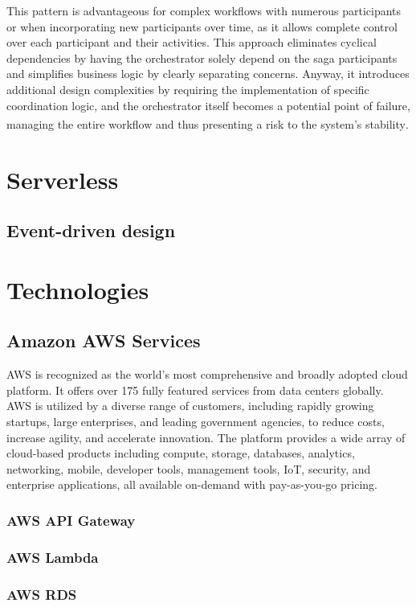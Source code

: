This pattern is advantageous for complex workflows with numerous participants or when incorporating
new participants over time, as it allows complete control over each participant and their
activities. This approach eliminates cyclical dependencies by having the orchestrator solely depend
on the saga participants and simplifies business logic by clearly separating concerns. Anyway, it
introduces additional design complexities by requiring the implementation of specific coordination
logic, and the orchestrator itself becomes a potential point of failure, managing the entire
workflow and thus presenting a risk to the system's stability\textsuperscript{\cite{ms_sagas}}.

\section{Serverless}
\subsection{Event-driven design}

\section{Technologies}
\subsection{Amazon AWS Services}
AWS is recognized as the world's most comprehensive and broadly adopted cloud platform. It offers
over 175 fully featured services from data centers globally. AWS is utilized by a diverse range of
customers, including rapidly growing startups, large enterprises, and leading government agencies,
to reduce costs, increase agility, and accelerate innovation. The platform provides a wide array of
cloud-based products including compute, storage, databases, analytics, networking, mobile, developer
tools, management tools, IoT, security, and enterprise applications, all available on-demand with
pay-as-you-go pricing.
\subsubsection{AWS API Gateway}
\subsubsection{AWS Lambda}
\subsubsection{AWS RDS}
